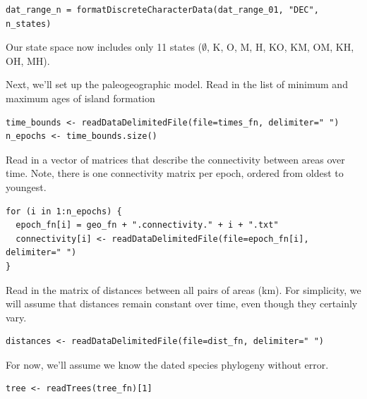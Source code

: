 \begin{snugshade}
\begin{lstlisting}
dat_range_n = formatDiscreteCharacterData(dat_range_01, "DEC", n_states)
\end{lstlisting}
\end{snugshade}

Our state space now includes only 11 states ($\emptyset$, K, O, M, H, KO, KM, OM, KH, OH, MH).

Next, we'll set up the paleogeographic model.
Read in the list of minimum and maximum ages of island formation

\begin{snugshade}
\begin{lstlisting}
time_bounds <- readDataDelimitedFile(file=times_fn, delimiter=" ")
n_epochs <- time_bounds.size()
\end{lstlisting}
\end{snugshade}

Read in a vector of matrices that describe the connectivity between areas over time.
Note, there is one connectivity matrix per epoch, ordered from oldest to youngest.

\begin{snugshade}
\begin{lstlisting}
for (i in 1:n_epochs) {
  epoch_fn[i] = geo_fn + ".connectivity." + i + ".txt"
  connectivity[i] <- readDataDelimitedFile(file=epoch_fn[i], delimiter=" ")
}
\end{lstlisting}
\end{snugshade}

Read in the matrix of distances between all pairs of areas (km). For simplicity, we will assume that distances remain constant over time, even though they certainly vary.

\begin{snugshade}
\begin{lstlisting}
distances <- readDataDelimitedFile(file=dist_fn, delimiter=" ")
\end{lstlisting}
\end{snugshade}


For now, we'll assume we know the dated species phylogeny without error.

\begin{snugshade}
\begin{lstlisting}
tree <- readTrees(tree_fn)[1]
\end{lstlisting}
\end{snugshade}

